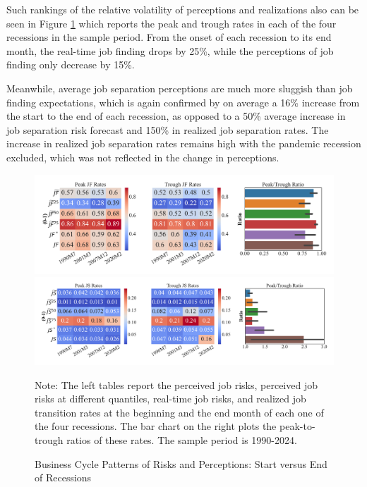 Such rankings of the relative volatility of perceptions and realizations also can be seen in Figure \ref{fig:bus_cycle_stats} which reports the peak and trough rates in each of the four recessions in the sample period. From the onset of each recession to its end month, the real-time job finding drops by 25\%, while the perceptions of job finding only decrease by 15\%. 

Meanwhile, average job separation perceptions are much more sluggish than job finding expectations, which is again confirmed by on average a 16\% increase from the start to the end of each recession, as opposed to a 50\% average increase in job separation risk forecast and 150\% in realized job separation rates. The increase in realized job separation rates remains high with the pandemic recession excluded, which was not reflected in the change in perceptions.  

\begin{figure}[pt] 
\centering 
	\caption{Business Cycle Patterns of Risks and Perceptions: Start versus End of Recessions} 
	\label{fig:bus_cycle_stats}
\includegraphics[width=0.99\linewidth]{text/chapter2/Figures/business_cycle_JF_peak_trough.pdf} \\
\includegraphics[width=0.99\linewidth]{text/chapter2/Figures/business_cycle_JS_peak_trough.pdf} \\
 	
    	\begin{flushleft}\footnotesize {Note: The left tables report the perceived job risks, perceived job risks at different quantiles, real-time job risks, and realized job transition rates at the beginning and the end month of each one of the four recessions. The bar chart on the right plots the peak-to-trough ratios of these rates. The sample period is 1990-2024.} \end{flushleft}
\end{figure}

